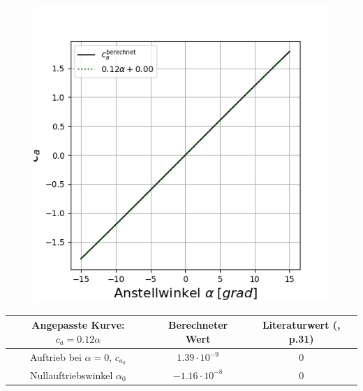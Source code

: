 \begin{minipage}{0.45\textwidth}
\begin{figure}[H]
    \centering
    \includegraphics[scale=0.4]{figures/NACA0012ca.png}
    \label{fig:nacaca}
\end{figure}
\end{minipage}

\begin{table}[H]
\label{tab:NACA0012cawerte}
\begin{center}
\begin{tabular}{c|cc}
Angepasste Kurve: $c_a = 0.12 \alpha$ & Berechneter Wert & Literaturwert (\cite{naca1945}, p.31) \\
\midrule
Auftrieb bei $\alpha = 0$, $c_{a_0}$ & $1.39 \cdot 10^{-9}$ & $0$ \\
Nullauftriebswinkel $\alpha_{0}$ & $-1.16 \cdot 10^{-8}$ & $0$ 
\end{tabular}
\end{center}
\end{table}

